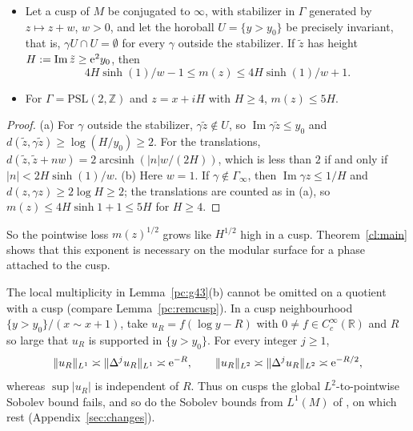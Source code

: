 \begin{lemma}\label{pc:remcusp}
\begin{itemize}
\item[\textup{(a)}] Let a cusp of $M$ be conjugated to $\infty$, with stabilizer in $\Gamma$ generated by $z\mapsto z+w$, $w>0$, and let the
horoball $U=\{y>y_0\}$ be precisely invariant, that is, $\gamma U\cap U=\emptyset$ for every $\gamma$ outside the stabilizer. If $\tilde z$
has height $H:=\operatorname{Im}\tilde z\ge\mathrm{e}^2y_0$, then
\[
  4H\sinh(1)/w-1\le m(z)\le4H\sinh(1)/w+1 .
\]
\item[\textup{(b)}] For $\Gamma=\mathrm{PSL}(2,\mathbb Z)$ and $z=x+iH$ with $H\ge4$, $m(z)\le5H$.
\end{itemize}
\end{lemma}
\begin{proof}
(a) For $\gamma$ outside the stabilizer, $\gamma\tilde z\notin U$, so $\operatorname{Im}\gamma\tilde z\le y_0$ and
$d(\tilde z,\gamma\tilde z)\ge\log(H/y_0)\ge2$. For the translations, $d(\tilde z,\tilde z+nw)=2\operatorname{arcsinh}(|n|w/(2H))$, which is
less than $2$ if and only if $|n|<2H\sinh(1)/w$.
(b) Here $w=1$. If $\gamma\notin\Gamma_\infty$, then $\operatorname{Im}\gamma z\le1/H$ and $d(z,\gamma z)\ge2\log H\ge2$; the translations
are counted as in (a), so $m(z)\le4H\sinh1+1\le5H$ for $H\ge4$. \qedhere
\end{proof}

So the pointwise loss $m(z)^{1/2}$ grows like $H^{1/2}$ high in a cusp. Theorem~\ref{cl:main} shows that this exponent is
necessary on the modular surface for a phase attached to the cusp.

\begin{remark}\label{rem:g4}
The local multiplicity in Lemma~\ref{pc:g43}(b) cannot be omitted on a quotient with a cusp (compare Lemma~\ref{pc:remcusp}). In a cusp neighbourhood $\{y>y_0\}/(x\sim x+1)$, take $u_R=f(\log y-R)$ with $0\ne f\in C_c^\infty(\mathbb R)$ and $R$ so large that $u_R$ is supported in $\{y>y_0\}$. For every integer $j\ge1$,
\[
\lVert u_R\rVert_{L^1}\asymp\lVert \Delta^ju_R\rVert_{L^1}\asymp\mathrm{e}^{-R},\qquad
\lVert u_R\rVert_{L^2}\asymp\lVert \Delta^ju_R\rVert_{L^2}\asymp\mathrm{e}^{-R/2},
\]
whereas $\sup|u_R|$ is independent of $R$. Thus on cusps the global $L^2$-to-pointwise Sobolev bound fails, and so do the
Sobolev bounds from $L^1(M)$ of \cite[(3.3), (3.4)]{S}, on which \cite[Proposition~3.2 and Corollary~3.4]{S} rest
(Appendix~\ref{sec:changes}).
\end{remark}


